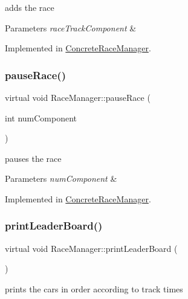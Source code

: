 adds the race 
\begin{DoxyParams}{Parameters}
{\em race\+Track\+Component} & \\
\hline
\end{DoxyParams}


Implemented in \mbox{\hyperlink{class_concrete_race_manager_ab6953cc9a9930e4e0af231f125f8f223}{Concrete\+Race\+Manager}}.

\mbox{\label{class_race_manager_a8718e9cf2da16ba3f468ac72b2ac5cc6}} 
\subsubsection{\texorpdfstring{pause\+Race()}{pauseRace()}}
{\footnotesize\ttfamily virtual void Race\+Manager\+::pause\+Race (\begin{DoxyParamCaption}\item[{int}]{num\+Component }\end{DoxyParamCaption})\hspace{0.3cm}{\ttfamily [pure virtual]}}

pauses the race 
\begin{DoxyParams}{Parameters}
{\em num\+Component} & \\
\hline
\end{DoxyParams}


Implemented in \mbox{\hyperlink{class_concrete_race_manager_ae9b205b7f73339c73d5f8f4457d01faf}{Concrete\+Race\+Manager}}.

\mbox{\label{class_race_manager_a2150e315365566150ce687020adc772f}} 
\subsubsection{\texorpdfstring{print\+Leader\+Board()}{printLeaderBoard()}}
{\footnotesize\ttfamily virtual void Race\+Manager\+::print\+Leader\+Board (\begin{DoxyParamCaption}{ }\end{DoxyParamCaption})\hspace{0.3cm}{\ttfamily [pure virtual]}}

prints the cars in order according to track times 

